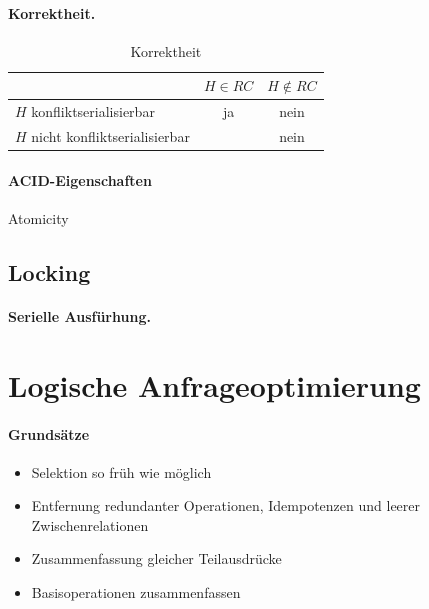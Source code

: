 \documentclass[]{scrartcl}
\begin{document}
\paragraph{Korrektheit.}

\begin{table}[htp]
\begin{center}
\begin{tabular}{lcc}
 & $H \in RC$ & $H \not \in RC$ \\
 \toprule
 $H$ konfliktserialisierbar & ja & nein \\
 $H$ nicht konfliktserialisierbar & & nein \\
\bottomrule
\end{tabular}
\end{center}
\caption{Korrektheit}
\label{default}
\end{table}%



\paragraph{ACID-Eigenschaften}

\begin{description}
\item[Atomicity] 
\end{description}




\subsection{Locking}

\paragraph{Serielle Ausf\"urhung.} 


\section{Logische Anfrageoptimierung}


\paragraph{Grunds\"atze}

\begin{itemize}
\item Selektion so fr\"uh wie m\"oglich
\item Entfernung redundanter Operationen, Idempotenzen und leerer Zwischenrelationen
\item Zusammenfassung gleicher Teilausdr\"ucke
\item Basisoperationen zusammenfassen
\end{itemize}
\end{document}
